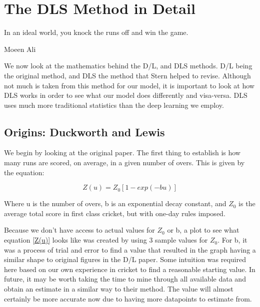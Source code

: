 \chapter{The DLS Method in Detail}

\epigraph{In an ideal world, you knock the runs off and win the game.}{Moeen Ali}

We now look at the mathematics behind the D/L, and DLS methods. D/L being the original
method, and DLS the method that Stern helped to revise. Although not much is taken from this method 
for our model, it is important to look at how DLS works in order to see what our model does differently 
and visa-versa. DLS uses much more traditional statistics than the deep learning we employ.

\section{Origins: Duckworth and Lewis}
We begin by looking at the original paper. The first thing to establish is how many runs are scored,
on average, in a given number of overs. This is given by the equation:

\begin{equation}
    Z(u) = Z_0[1-exp(-bu)]
    \label{Z(u)}  
\end{equation}

Where u is the number of overs, b is an exponential decay constant, and $Z_0$ is the
average total score in first class cricket, but with one-day rules imposed.  

Because we don't have access to actual values for $Z_0$ or b, a plot to see what equation \ref{Z(u)} looks 
like was created by using 3 sample values for $Z_0$. For b, it was a process of trial and error to find a value
that resulted in the graph having a similar shape to original figures in the D/L paper. Some intuition was required here 
based on our own experience in cricket to find a reasonable starting value. In future, it may be worth taking the time to 
mine through all available data and obtain an estimate in a similar way to their method. The value will almost certainly 
be more accurate now due to having more datapoints to estimate from.

